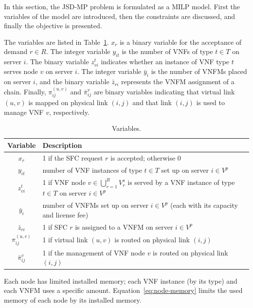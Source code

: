 In this section, the JSD-MP problem is formulated as a MILP model. First the
variables of the model are introduced, then the constraints are discussed, and
finally the objective is presented.

The variables are listed in Table~\ref{tbl:variables}. \(x_r\) is a binary
variable for the acceptance of demand \(r \in R\). The integer variable
\(y_{it}\) is the number of VNFs of type \(t \in T\) on server \(i\). The binary
variable \(z^t_{vi}\) indicates whether an instance of VNF type \(t\) serves node
\(v\) on server \(i\). The integer variable \(\bar{y}_i\) is the number of VNFMs
placed on server \(i\), and the binary variable \(\bar{z}_{ri}\) represents the
VNFM assignment of a chain. Finally, \(\pi^{(u,v)}_{ij}\) and \(\bar{\pi}^v_{ij}\)
are binary variables indicating that virtual link \((u,v)\) is mapped on physical
link \((i,j)\) and that link \((i,j)\) is used to manage VNF \(v\), respectively.

\begin{table}[H]
\caption{Variables.}
\label{tbl:variables}
\small
\begin{tabularx}{\textwidth}{cX}
\toprule
\textbf{Variable} & \textbf{Description} \\
\midrule
\(x_r\) & 1 if the SFC request \(r\) is accepted; otherwise 0 \\
\(y_{it}\) & number of VNF instances of type \(t \in T\) set up on server \(i \in V^p\) \\
\(z^t_{vi}\) & 1 if VNF node \(v \in \bigcup_{r=1}^{R} V^s_r\) is served by a VNF instance of type \(t \in T\) on server \(i \in V^p\) \\
\(\bar{y}_i\) & number of VNFMs set up on server \(i \in V^p\) (each with its capacity and license fee) \\
\(\bar{z}_{ri}\) & 1 if SFC \(r\) is assigned to a VNFM on server \(i \in V^p\) \\
\(\pi^{(u,v)}_{ij}\) & 1 if virtual link \((u,v)\) is routed on physical link \((i,j)\) \\
\(\bar{\pi}^v_{ij}\) & 1 if the management of VNF node \(v\) is routed on physical link \((i,j)\) \\
\bottomrule
\end{tabularx}
\end{table}

Each node has limited installed memory; each VNF instance (by its type) and each
VNFM uses a specific amount. Equation~\eqref{eq:node-memory} limits the used
memory of each node by its installed memory.

